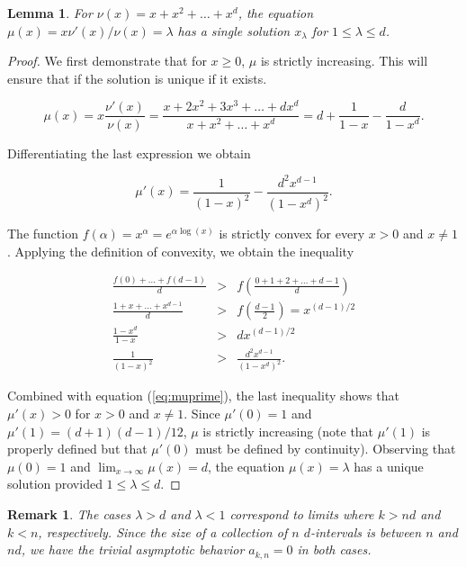 \documentclass{article}
\newtheorem{lemma}{Lemma}
\newtheorem*{remark}{Remark}
\begin{document}
\begin{lemma}
\label{th:mu}
For $\nu(x) = x+x^2+\ldots+x^d$, the equation $\mu(x) = x\nu'(x)/\nu(x) =
\lambda$ has a single solution $x_\lambda$ for $1 \leq \lambda \leq d$.
\end{lemma}

\begin{proof}
We first demonstrate that for $x \geq 0$, $\mu$ is strictly increasing.
This will ensure that if the solution is unique if it exists.

\begin{equation}
\label{eq:mu}
\mu(x) = x\frac{\nu'(x)}{\nu(x)} =
\frac{x+2x^2+3x^3+\ldots+dx^d}{x+x^2+\ldots+x^d} =
d+\frac{1}{1-x} - \frac{d}{1-x^d}.
\end{equation} 

Differentiating the last expression we obtain

\begin{equation}
\label{eq:muprime}
\mu'(x) = \frac{1}{(1-x)^2} -\frac{d^2x^{d-1}}{(1-x^d)^2}.
\end{equation}

The function $f(\alpha) = x^{\alpha} = e^{\alpha \log(x)}$ is strictly
convex for every $x > 0$ and $x \neq 1$. Applying the definition of
convexity, we obtain the inequality

\begin{eqnarray*}
\frac{f(0)+\ldots+f(d-1)}{d} &>&
f\left(\frac{0+1+2+\ldots+d-1}{d}\right) \\
\frac{1+x+\ldots+x^{d-1}}{d} &>& f\left(\frac{d-1}{2}\right)
= x^{(d-1)/2} \\
\frac{1-x^d}{1-x} &>& dx^{(d-1)/2} \\
\frac{1}{(1-x)^2} &>& \frac{d^2x^{d-1}}{(1-x^d)^2}.
\end{eqnarray*}

Combined with equation (\ref{eq:muprime}), the last inequality shows that
$\mu'(x) > 0$ for $x > 0$ and $x \neq 1$. Since $\mu'(0) = 1$ and $\mu'(1)
= (d+1)(d-1)/12$, $\mu$ is strictly increasing (note that $\mu'(1)$ is
properly defined but that $\mu'(0)$ must be defined by continuity).
Observing that $\mu(0) = 1$ and $\lim_{x\rightarrow\infty} \mu(x) = d$,
the equation $\mu(x) = \lambda$ has a unique solution provided $1 \leq
\lambda \leq d$.
\end{proof}

\begin{remark}
The cases $\lambda > d$ and $\lambda < 1$ correspond to limits where $k >
nd$ and $k < n$, respectively. Since the size of a collection of $n$
$d$-intervals is between $n$ and $nd$, we have the trivial asymptotic
behavior $a_{k,n} = 0$ in both cases.
\end{remark}
\end{document}
